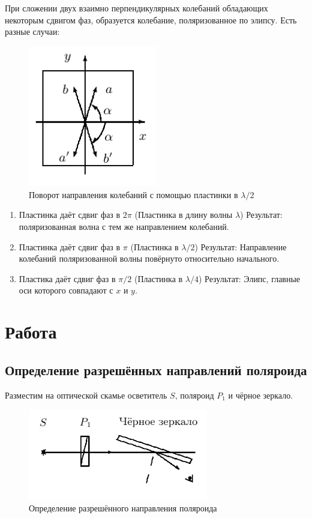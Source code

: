 \documentclass{article}
\begin{document}
При сложении двух взаимно перпендикулярных колебаний обладающих некоторым сдвигом фаз, образуется
колебание, поляризованное по элипсу. Есть разные случаи:

\begin{figure}[H]
    \centering
    \includegraphics[width=0.5\textwidth]{oscillation-rotate.png}
    \caption{Поворот направления колебаний с помощью пластинки в \(\lambda/2\)}
\end{figure} 

\begin{enumerate}
    \item Пластинка даёт сдвиг фаз в \(2\pi\) (Пластинка в длину волны \(\lambda\))
Результат: поляризованная волна с тем же направлением колебаний.
    \item Пластинка даёт сдвиг фаз в \(\pi\) (Пластинка в \(\lambda/2\))
Результат: Направление колебаний поляризованной волны повёрнуто относительно начального.
    \item Пластика даёт сдвиг фаз в \(\pi/2\) (Пластинка в \(\lambda/4\))
Результат: Элипс, главные оси которого совпадают с \(x\) и \(y\).
\end{enumerate}

\section{Работа}

\subsection{Определение разрешённых направлений поляроида}
Разместим на оптической скамье осветитель \(S\), поляроид \(P_1\) и чёрное зеркало.

\begin{figure}[H]
    \centering
    \includegraphics[width=0.7\textwidth]{polaroid-direction.png}
    \caption{Определение разрешённого направления поляроида}
    \label{fig:pol-dir}
\end{figure} 
\end{document}
